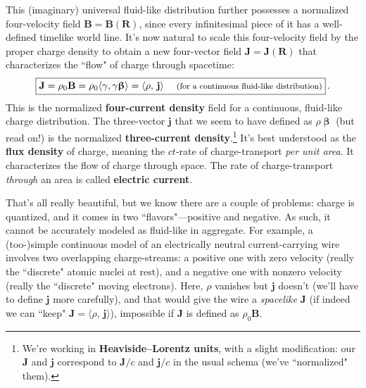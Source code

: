\documentclass[12pt]{article}
\renewcommand{\vv}[1]{\mathbf{#1}}
\newcommand{\vvbeta}{\bm{\upbeta}}
\begin{document}
This (imaginary) universal fluid-like distribution further possesses a normalized four-velocity field $\vv B = \vv B (\vv R)$, since every infinitesimal piece of it has a well-defined timelike world line. It's now natural to scale this four-velocity field by the proper charge density to obtain a new four-vector field $\vv J = \vv J (\vv R)$ that characterizes the ``flow" of charge through spacetime:
\begin{equation}\label{eq:fcc}
\boxed{\vv J = \rho_0 \vv B = \rho_0 \langle \gamma , \gamma \vvbeta \rangle = \langle \rho, \, \vv j \rangle \quad \text{\footnotesize{ (for a continuous fluid-like distribution)}} } \, .
\end{equation}
This is the normalized \textbf{four-current density} field for a continuous, fluid-like charge distribution. The three-vector $\vv j$ that we seem to have defined as $\rho \vvbeta$ (but read on!) is the normalized \textbf{three-current density}.\footnote{We're working in \textbf{Heaviside--Lorentz units}, with a slight modification: our $\vv J$ and $\vv j$ correspond to $\vv J / c$ and $\vv j / c$ in the usual schema (we've ``normalized" them).} It's best understood as the \textbf{flux density} of charge, meaning the $ct$-rate of charge-transport \emph{per unit area}. It characterizes the flow of charge through space. The rate of charge-transport \emph{through} an area is called \textbf{electric current}.

That's all really beautiful, but we know there are a couple of problems: charge is quantized, and it comes in two ``flavors"---positive and negative. As such, it cannot be accurately modeled as fluid-like in aggregate. For example, a (too-)simple continuous model of an electrically neutral current-carrying wire involves two overlapping charge-streams: a positive one with zero velocity (really the ``discrete" atomic nuclei at rest), and a negative one with nonzero velocity (really the ``discrete" moving electrons). Here, $\rho$ vanishes but $\vv j$ doesn't (we'll have to define $\vv j$ more carefully), and that would give the wire a \emph{spacelike} $\vv J$ (if indeed we can ``keep" $\vv J = \langle \rho, \, \vv j \rangle$), impossible if $\vv J$ is defined as $\rho_0 \vv B$.
\end{document}
